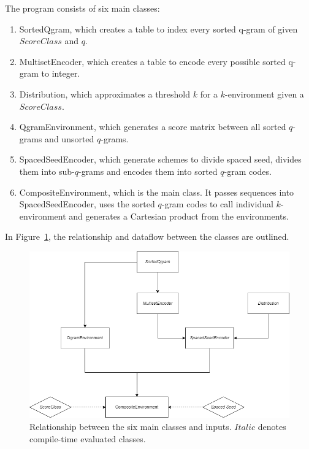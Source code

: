 The program consists of six main classes:
\begin{enumerate}
    \item SortedQgram, which creates a table to index every sorted q-gram of given $ScoreClass$ and $q$.
    \item MultisetEncoder, which creates a table to encode every possible sorted q-gram to integer.
    \item Distribution, which approximates a threshold $k$ for a $k$-environment given a $ScoreClass$.
    \item QgramEnvironment, which generates a score matrix between all sorted $q$-grams and unsorted $q$-grams.
    \item SpacedSeedEncoder, which generate schemes to divide spaced seed, divides them into sub-$q$-grams and encodes them into sorted $q$-gram codes.
    \item CompositeEnvironment, which is the main class. It passes sequences into SpacedSeedEncoder, uses the sorted $q$-gram codes to call individual $k$-environment and generates a Cartesian product from the environments.
\end{enumerate}
In Figure~\ref{fig:classes}, the relationship and dataflow between the classes are outlined.

\begin{figure}[t]
\begin{center}
\includegraphics[scale=0.6]{graphics/Class Diagram.png}
\end{center}
\caption{Relationship between the six main classes and inputs. $Italic$ denotes compile-time evaluated classes.}
\label{fig:classes}
\end{figure}